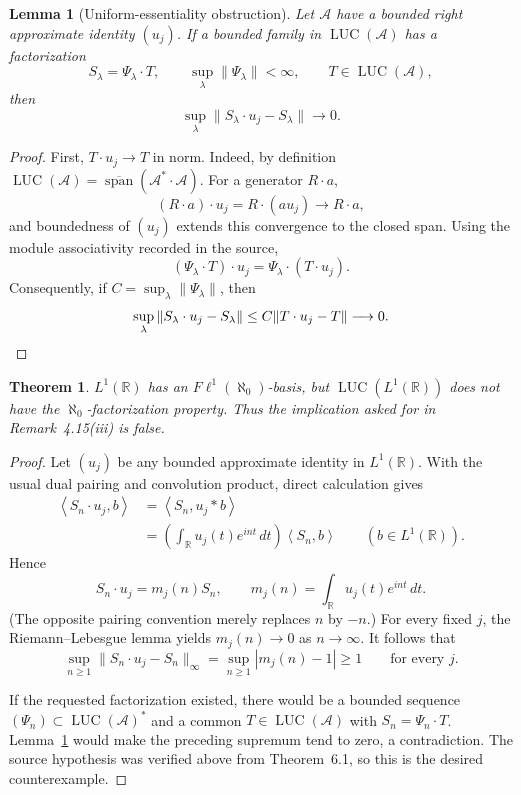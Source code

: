 \documentclass[10pt]{article}
\newtheorem{theorem}{Theorem}
\newtheorem{lemma}{Lemma}
\newcommand{\A}{\mathcal A}
\newcommand{\LUC}{\operatorname{LUC}}
\newcommand{\ip}[2]{\left\langle #1,#2\right\rangle}
\begin{document}
\begin{lemma}[Uniform-essentiality obstruction]\label{lem:uniform}
Let $\A$ have a bounded right approximate identity $(u_j)$.  If a bounded
family in $\LUC(\A)$ has a factorization
\[
 S_\lambda=\Psi_\lambda\cdot T,
 \qquad \sup_\lambda\|\Psi_\lambda\|<\infty,
 \qquad T\in\LUC(\A),
\]
then
\[
 \sup_\lambda\|S_\lambda\cdot u_j-S_\lambda\|\longrightarrow0.
\]
\end{lemma}

\begin{proof}
First, $T\cdot u_j\to T$ in norm.  Indeed, by definition
$\LUC(\A)=\overline{\operatorname{span}}(\A^*\cdot\A)$.  For a generator
$R\cdot a$,
\[
 (R\cdot a)\cdot u_j=R\cdot(au_j)\longrightarrow R\cdot a,
\]
and boundedness of $(u_j)$ extends this convergence to the closed span.
Using the module associativity recorded in the source,
\[
 (\Psi_\lambda\cdot T)\cdot u_j
 =\Psi_\lambda\cdot(T\cdot u_j).
\]
Consequently, if $C=\sup_\lambda\|\Psi_\lambda\|$, then
\[
 \sup_\lambda\|S_\lambda\cdot u_j-S_\lambda\|
 \le C\|T\cdot u_j-T\|\longrightarrow0. \qedhere
\]
\end{proof}

\begin{theorem}\label{thm:counterexample}
$L^1(\mathbb R)$ has an $F\ell^1(\aleph_0)$-basis, but
$\LUC(L^1(\mathbb R))$ does not have the $\aleph_0$-factorization property.
Thus the implication asked for in Remark~4.15(iii) is false.
\end{theorem}

\begin{proof}
Let $(u_j)$ be any bounded approximate identity in $L^1(\mathbb R)$.  With
the usual dual pairing and convolution product, direct calculation gives
\begin{align*}
 \ip{S_n\cdot u_j}{b}
 &=\ip{S_n}{u_j*b}\\
 &=\left(\int_{\mathbb R}u_j(t)e^{int}\,dt\right)
   \ip{S_n}{b}
 \qquad(b\in L^1(\mathbb R)).
\end{align*}
Hence
\[
 S_n\cdot u_j=m_j(n)S_n,
 \qquad m_j(n)=\int_{\mathbb R}u_j(t)e^{int}\,dt.
\]
(The opposite pairing convention merely replaces $n$ by $-n$.)  For every
fixed $j$, the Riemann--Lebesgue lemma \cite[Ch.~1]{Rudin} yields
$m_j(n)\to0$ as $n\to\infty$.  It follows that
\[
 \sup_{n\ge1}\|S_n\cdot u_j-S_n\|_\infty
 =\sup_{n\ge1}|m_j(n)-1|\ge1
 \qquad\text{for every }j.
\]

If the requested factorization existed, there would be a bounded sequence
$(\Psi_n)\subset\LUC(\A)^*$ and a common $T\in\LUC(\A)$ with
$S_n=\Psi_n\cdot T$.  Lemma~\ref{lem:uniform} would make the preceding
supremum tend to zero, a contradiction.  The source hypothesis was verified
above from Theorem~6.1, so this is the desired counterexample.
\end{proof}
\end{document}
